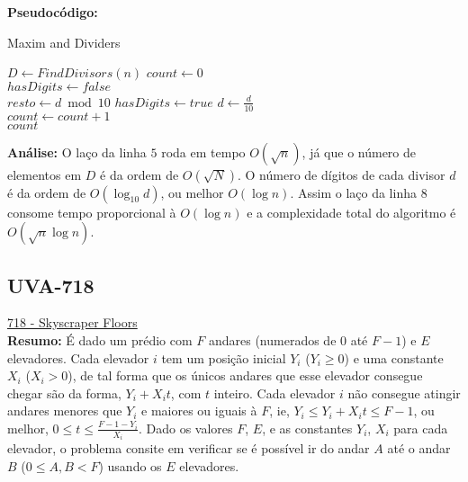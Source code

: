 \textbf{Pseudocódigo:}
\begin{algorithm}
\caption{Maxim and Dividers}
\begin{algorithmic}[1]
\State $D \gets FindDivisors(n)$ 
\State $count \gets 0$
\\
\State $hasDigits \gets false$
\\
\State $resto \gets d \bmod 10$
\State $hasDigits \gets true$
\EndIf
\State $d \gets \frac{d}{10}$
\EndWhile
\\
\State $count \gets count + 1$
\EndIf
\EndFor
\\
\State \Return $count$

\EndProcedure
\end{algorithmic}
\end{algorithm}


\textbf{Análise:}
O laço da linha $5$ roda em tempo $O(\sqrt{n})$, já que o número de elementos em $D$ é da ordem de $O(\sqrt{N})$. O número de dígitos de cada divisor $d$ é da ordem de 
$O(\log_{10}d)$, ou melhor $O(\log n)$. Assim o laço da linha $8$ consome tempo proporcional à $O(\log n)$ e a complexidade total do algoritmo é $O(\sqrt n\log n)$. 




\subsection{UVA-718}
\href{https://uva.onlinejudge.org/index.php?option=com_onlinejudge&Itemid=8&page=show_problem&problem=659}{718 - Skyscraper Floors}\\

\textbf{Resumo:}
É dado um prédio com $F$ andares (numerados de $0$ até $F-1$) e $E$ elevadores. Cada elevador $i$ tem um posição inicial $Y_i$ ($Y_i \geq 0$) e uma constante $X_i$ ($X_i > 0$), 
de tal forma que os únicos andares que esse elevador consegue chegar são da forma, $Y_i+X_it$, com $t$ inteiro. 
Cada elevador $i$ não consegue atingir andares menores que $Y_i$ e maiores ou iguais à $F$, ie, $Y_i \leq Y_i+X_it \leq F-1$, ou melhor, $0 \leq t \leq \frac{F-1-Y_i}{X_i}$.
Dado os valores $F$, $E$, e as constantes $Y_i$, $X_i$ para cada elevador, o problema consite em verificar se é possível ir do andar $A$ até o andar $B$ ($0\leq A,B <F$)
usando os $E$ elevadores.
\\

